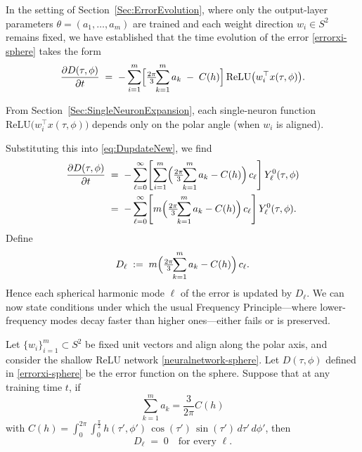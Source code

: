 \documentclass[review,onefignum,onetabnum,onealgnum]{siamart250106}
\numberwithin{theorem}{section}
\begin{document}
In the setting of Section~\ref{Sec:ErrorEvolution}, where only the output-layer parameters 
\(\theta=(a_1,\ldots,a_m)\) are trained and each weight direction \(w_i\in S^2\) remains fixed, we have established that 
the time evolution of the error \eqref{errorxi-sphere} takes the form
\begin{equation}\label{eq:DupdateNew}
\frac{\partial D(\tau,\phi)}{\partial t}
\;=\;
-\sum_{i=1}^m
\Bigl[\tfrac{2\pi}{3}\!\!\sum_{k=1}^m a_k \;-\;C(h)\Bigr]\,
\mathrm{ReLU}\bigl(w_i^\top x(\tau,\phi)\bigr).
\end{equation}


From Section~\ref{Sec:SingleNeuronExpansion}, each single-neuron function 
\(\mathrm{ReLU}\bigl(w_i^\top x(\tau,\phi)\bigr)\) depends only on the polar angle (when $w_i$ is aligned).

Substituting this into \eqref{eq:DupdateNew}, we find
\begin{equation}
    \begin{aligned}
\frac{\partial D(\tau,\phi)}{\partial t}
&\;=\;
-\sum_{\ell=0}^\infty
\Biggl[
\sum_{i=1}^m
\Bigl(\tfrac{2\pi}{3}\!\!\sum_{k=1}^m a_k - C(h)\Bigr)\,c_{\ell}
\Biggr]\,
Y_{\ell}^0(\tau,\phi)\\
&\;=\;
-\sum_{\ell=0}^\infty
\Biggl[
m\Bigl(\tfrac{2\pi}{3}\!\!\sum_{k=1}^m a_k - C(h)\Bigr)\,c_{\ell}
\Biggr]\,
Y_{\ell}^0(\tau,\phi).
\end{aligned}
\end{equation}
Define
\begin{equation}\label{D_ellfixed}
D_{\ell}
\;:=\;
m\Bigl(\tfrac{2\pi}{3}\!\!\sum_{k=1}^m a_k - C(h)\Bigr)\,c_{\ell}.
\end{equation}
Hence each spherical harmonic mode \(\ell\) of the error is updated by \(D_{\ell}\).  We can now state 
conditions under which the usual Frequency Principle---where lower-frequency modes decay faster than 
higher ones---either fails or is preserved.

\begin{theorem}\label{thm:fp-fails-zeroD-new}
Let \(\{w_i\}_{i=1}^m \subset S^2\) be fixed unit vectors and align along the polar axis, and consider the shallow ReLU network \eqref{neuralnetwork-sphere}. Let \(D(\tau,\phi)\) defined in \eqref{errorxi-sphere} be the error function on the sphere.  
Suppose that at any training time $t$, if $$
\sum_{k=1}^m a_k = \frac{3}{2\pi}C(h)$$
with $C(h) = \int_{0}^{2\pi}\!\!\int_{0}^{\tfrac{\pi}{2}}
h(\tau',\phi')\,\cos(\tau')\,\sin(\tau')\,d\tau'\,d\phi'$, then
\[
D_{\ell}
\;=\;
0
\quad
\text{for every }\ell.
\]
\end{theorem}
\end{document}
